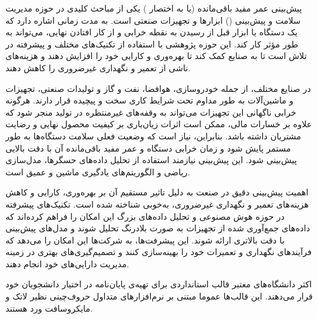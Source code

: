 

پیش‌بینی عمر مفید باقی‌مانده (یا به اختصار ) یکی از مباحث کلیدی در حوزه مدیریت سلامت و پیش‌بینی () ابزارها و تجهیزات صنعتی است.  به مدت زمانی اشاره دارد که یک دستگاه یا ابزار قبل از رسیدن به نقطه خرابی و از کار افتادن نهایی، می‌تواند به طور مؤثر کار کند. این حوزه پژوهشی با استفاده از تکنیک‌های مختلف و پیشرفته در تلاش است تا به صنایع کمک کند تا بهره‌وری و کارایی خود را افزایش دهند و هزینه‌های ناشی از تعمیر و نگهداری غیرضروری را کاهش دهند.








در صنایع مختلف، از جمله خودروسازی، هوافضا، نفت و گاز و تولیدات صنعتی، تجهیزات و ماشین‌آلات به طور مداوم تحت شرایط کاری سخت و پیچیده قرار دارند. هرگونه خرابی ناگهانی این تجهیزات می‌تواند به وقفه‌های غیرمنتظره در تولید منجر شود که علاوه بر خسارات مالی، ممکن است اثرات زیان‌باری بر کیفیت محصول نهایی و رضایت مشتریان داشته باشد. بنابراین، نیاز است که وضعیت فعلی سلامت دستگاه‌ها به طور مستمر پایش شود و زمان خرابی دستگاه و عمر مفید باقی‌مانده آن با دقت بالایی پیش‌بینی شود. این پیش‌بینی نیازمند استفاده از تحلیل داده‌های حسگرها، مدل‌سازی ریاضی و الگوریتم‌های یادگیری ماشین و عمیق است.







اهمیت پیش‌بینی دقیق  در صنعت به دلیل تاثیر مستقیم آن بر بهره‌وری، کارایی و کاهش هزینه‌های تعمیر و نگهداری غیرضروری، به‌خوبی شناخته شده است. تکنیک‌های پیشرفته در حوزه هوش مصنوعی و تحلیل داده‌های بزرگ این امکان را فراهم کرده‌اند که داده‌های جمع‌آوری شده از تجهیزات به صورت بلادرنگ تحلیل شوند و مدل‌های پیش‌بینی  با دقت بالاتری ارائه شوند. این پیشرفت‌ها، به شرکت‌ها این امکان را می‌دهد که فرآیندهای نگهداری و تعمیرات خود را بهینه‌سازی کنند و تصمیم‌گیری‌های بهتری در زمینه مدیریت دارایی‌های خود انجام دهند.





اکثر دانشگاه‌های معتبر قالب استانداردی برای تهیه‌ی پایان‌نامه در اختیار دانشجویان خود قرار می‌دهند.
این قالب‌ها عموما مبتنی بر نرم‌افزارهای متداول حروف‌چینی نظیر لاتک و مایکروسافت ورد هستند.

